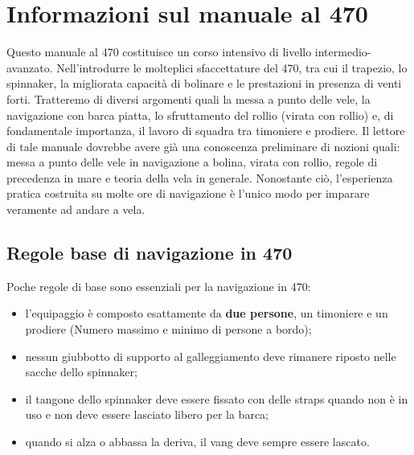 \chapter{Informazioni sul manuale al 470}
\label{ch:InformazioniSulManuale}
Questo manuale al 470 costituisce un corso intensivo di livello
intermedio-avanzato. Nell'introdurre le molteplici sfaccettature del 470, tra
cui il trapezio, lo spinnaker, la migliorata capacità di bolinare e le
prestazioni in presenza di venti forti. Tratteremo di diversi argomenti quali la
messa a punto delle vele, la navigazione con barca piatta, lo sfruttamento del
rollio (virata con rollio) e, di fondamentale importanza, il lavoro di squadra
tra timoniere e prodiere. Il lettore di tale manuale dovrebbe avere già una
conoscenza preliminare di nozioni quali: messa a punto delle vele in navigazione
a bolina, virata con rollio, regole di precedenza in mare e teoria della vela in
generale. Nonostante ciò, l'esperienza pratica costruita su molte ore di
navigazione è l'unico modo per imparare veramente ad andare a vela.

\section{Regole base di navigazione in 470}
\label{sec:RegoleBaseDiNavigazioneIn470}
Poche regole di base sono essenziali per la navigazione in 470:
\begin{itemize}
    \item l'equipaggio è composto esattamente da \textbf{due persone}, un
          timoniere e un prodiere (Numero massimo e minimo di persone a bordo);
    \item nessun giubbotto di supporto al galleggiamento deve rimanere riposto
          nelle sacche dello spinnaker;
    \item il tangone dello spinnaker deve essere fissato con delle straps quando
          non è in uso e non deve essere lasciato libero per la barca;
    \item quando si alza o abbassa la deriva, il vang deve sempre essere
    lascato.
\end{itemize}

